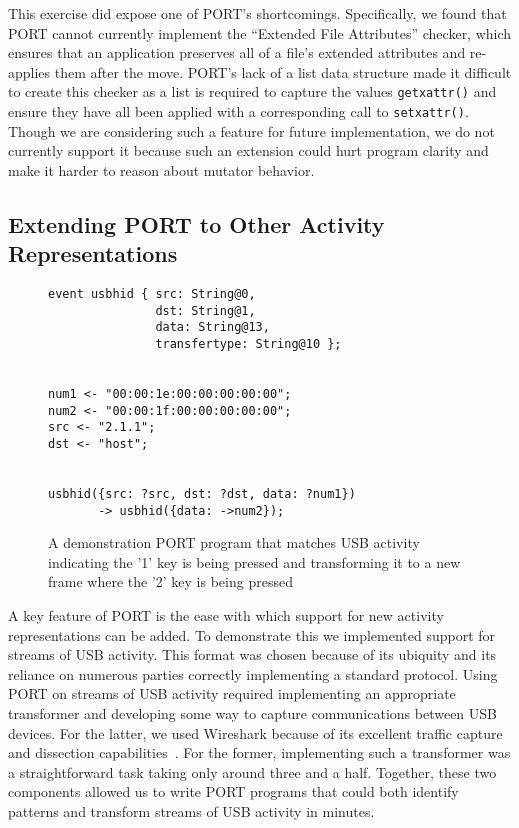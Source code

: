 This exercise did expose one of PORT's shortcomings.  Specifically,
we found that PORT cannot currently implement the ``Extended File
Attributes'' checker, which
 ensures that an application
preserves all of a file's extended attributes and re-applies them after the move.
PORT's lack of a list data structure made it difficult to create this checker as a
list is required to capture the values {\tt getxattr()}
and ensure they have all been applied with a
corresponding call to {\tt setxattr()}.
Though we are considering such a feature for future implementation,
we do not currently support it because such an extension could
hurt program clarity and make it harder to reason about
mutator behavior.


\subsection{Extending PORT to Other Activity Representations}
\begin{figure}
  \begin{lstlisting}[basicstyle=\ttfamily,xleftmargin=.8em]
event usbhid { src: String@0,
               dst: String@1,
               data: String@13,
               transfertype: String@10 };
               
              
num1 <- "00:00:1e:00:00:00:00:00";
num2 <- "00:00:1f:00:00:00:00:00";
src <- "2.1.1";
dst <- "host";


usbhid({src: ?src, dst: ?dst, data: ?num1})
       -> usbhid({data: ->num2});
  \end{lstlisting}
  \caption{A demonstration PORT program that matches USB activity indicating the '1' key is being pressed and transforming it to a new frame where the '2' key is being pressed}
  \label{fig:USB}
\end{figure}


A key feature of PORT is the ease with which support for new activity representations
can be added. To demonstrate this
we implemented support for streams of USB activity. This format was chosen because of its ubiquity and its reliance on numerous parties correctly implementing a standard protocol.
Using PORT on streams of USB activity required implementing an appropriate transformer and developing some way to capture communications between USB devices.
For the latter, we used Wireshark because of its excellent traffic capture and dissection capabilities~\cite{wireshark}.
For the former, implementing such a transformer was a straightforward task taking only around three and a half.
Together, these two components allowed us to write PORT programs that could both identify patterns and transform streams of USB activity in minutes.


